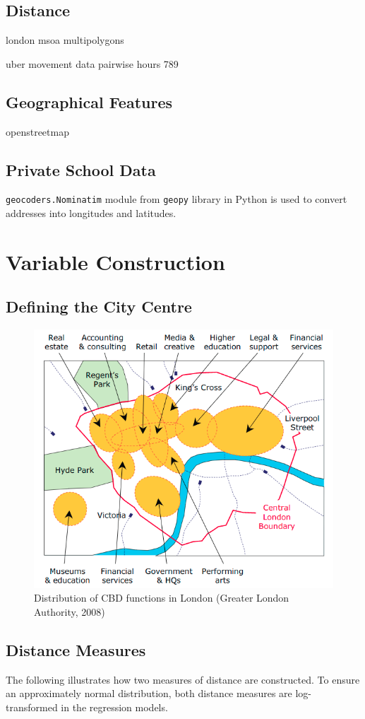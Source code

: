 \documentclass{article}
\begin{document}
\subsection{Distance}
london msoa
multipolygons

uber movement data 
pairwise hours 789

\subsection{Geographical Features}
openstreetmap

\subsection{Private School Data}
\texttt{geocoders.Nominatim} module from \texttt{geopy} library in Python is used to convert addresses into longitudes and latitudes.

\section{Variable Construction}
\subsection{Defining the City Centre}
\begin{figure}[H]
  \centering
  \includegraphics[width=0.5\linewidth]{images/cbd.png}
  \caption{Distribution of CBD functions in London (Greater London Authority, 2008)}
  \label{fig:cbd}
\end{figure}


\subsection{Distance Measures}
The following illustrates how two measures of distance are constructed. To ensure an approximately normal distribution, both distance measures are log-transformed in the regression models.
\end{document}
